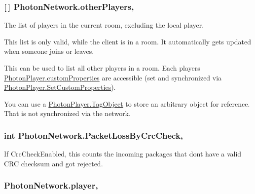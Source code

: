 \subsubsection[{\texorpdfstring{other\+Players}{otherPlayers}}]{ \mbox{[}$\,$\mbox{]} Photon\+Network.\+other\+Players\hspace{0.3cm}{\ttfamily [static]}, {\ttfamily [get]}}\hypertarget{class_photon_network_a894df24398c8cfe2d06e22ddc39576fa}{}\label{class_photon_network_a894df24398c8cfe2d06e22ddc39576fa}


The list of players in the current room, excluding the local player. 

This list is only valid, while the client is in a room. It automatically gets updated when someone joins or leaves.

This can be used to list all other players in a room. Each player\textquotesingle{}s \hyperlink{class_photon_player_ab7e0bc6125b15524e74b5ac9d7c337d7}{Photon\+Player.\+custom\+Properties} are accessible (set and synchronized via \hyperlink{class_photon_player_af8815abb8edaafbe6bddbf328f9612fb}{Photon\+Player.\+Set\+Custom\+Properties}).

You can use a \hyperlink{class_photon_player_aaf54b32878a605d3e4d47f16ad106aa3}{Photon\+Player.\+Tag\+Object} to store an arbitrary object for reference. That is not synchronized via the network. 
\subsubsection[{\texorpdfstring{Packet\+Loss\+By\+Crc\+Check}{PacketLossByCrcCheck}}]{\setlength{\rightskip}{0pt plus 5cm}int Photon\+Network.\+Packet\+Loss\+By\+Crc\+Check\hspace{0.3cm}{\ttfamily [static]}, {\ttfamily [get]}}\hypertarget{class_photon_network_a587a1fb0147ddc48a5176e48a2940985}{}\label{class_photon_network_a587a1fb0147ddc48a5176e48a2940985}


If Crc\+Check\+Enabled, this counts the incoming packages that don\textquotesingle{}t have a valid C\+RC checksum and got rejected.

\subsubsection[{\texorpdfstring{player}{player}}]{ Photon\+Network.\+player\hspace{0.3cm}{\ttfamily [static]}, {\ttfamily [get]}}\hypertarget{class_photon_network_a1b3803f17c6d713593bca41547b8b9b3}{}\label{class_photon_network_a1b3803f17c6d713593bca41547b8b9b3}


